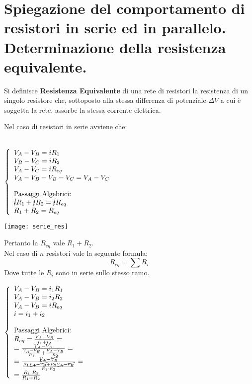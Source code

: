\section{Spiegazione del comportamento di resistori in serie ed in
	parallelo. Determinazione della resistenza equivalente.}

Si definisce \textbf{Resistenza Equivalente} di una rete di resistori la resistenza di un singolo resistore che, sottoposto alla stessa differenza di potenziale $\Delta V$ a cui \`e soggetta la rete, assorbe la stessa corrente elettrica.

Nel caso di resistori in serie avviene che:\\
\\
\noindent\begin{minipage}{0.3\textwidth}
$
\left\{
\begin{array}{lr}
	V_A - V_B = i R_1 \\	
	V_B - V_C = i R_2	\\	
	V_A - V_C = i R_{eq} \\
	V_A - V_B + V_B - V_C = V_A - V_C \\
	\\
	\textnormal{Passaggi Algebrici:}\\
	\cancel{i} R_1 + \cancel{i} R_2 = \cancel{i} R_{eq} \\
	R_1 + R_2 = R_{eq}
\end{array}
\right.
$
\end{minipage}
\hfill%
\begin{minipage}{0.6\textwidth}\raggedleft
	\texttt{[image: serie\_res]}
\end{minipage}
Pertanto la $R_{eq}$ vale $R_1 + R_2$.\\
Nel caso di $n$ resistori vale la seguente formula:
\begin{equation}
    R_{eq} = \sum{R_i}
\end{equation}
Dove tutte le $R_i$ sono in serie sullo stesso ramo.\\
\noindent\begin{minipage}{0.3\textwidth}
	$
	\left\{
	\begin{array}{lr}
	V_A - V_B = i_1 R_1 \\	
	V_A - V_B = i_2 R_2	\\	
	V_A - V_B = i R_{eq} \\
	i = i_1 + i_2 \\
	\\
	\textnormal{Passaggi Algebrici:}\\
	R_{eq} = \frac{V_A - V_B}{i_1 + i_2} =\\
	= \frac{V_A - V_B}{\frac{V_A - V_B}{R_1} + \frac{V_A - V_B}{R_2}} =\\
	= \frac{\cancel{V_A - V_B}}{\frac{R_1\cancel{V_A - V_B} + R_2\cancel{V_A - V_B}}{R_1 \cdot R_2}} =\\
	= \frac{R_1 \cdot R_2}{R_1 + R_2}
	\end{array}
	\right.
	$
\end{minipage}
